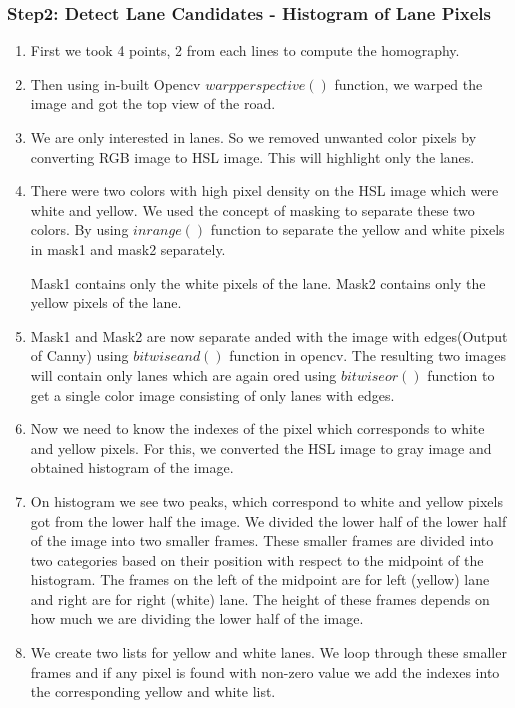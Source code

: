 \documentclass[12pt]{article}
\begin{document}
\subsubsection{Step2: Detect Lane Candidates - Histogram of Lane Pixels}
\begin{enumerate}
\item First we took 4 points, 2  from each lines to compute the homography.

\item Then using in-built Opencv $warpperspective()$ function, we warped the image and got the top view of the road.

\item We are only interested in lanes. So we removed unwanted color pixels by converting RGB image to HSL image. This will highlight only the lanes.

\item There were two colors with high pixel density on the HSL image which were white and yellow. We used the concept of masking to separate these two colors. By using $inrange()$ function to separate the yellow and white pixels in mask1 and mask2 separately.

Mask1 contains only the white pixels of the lane.
Mask2 contains only the yellow pixels of the lane.

\item Mask1 and Mask2 are now separate anded with the image with edges(Output of Canny) using $bitwiseand()$ function in opencv. The resulting two images will contain only lanes which are again ored using $bitwiseor()$ function to get a single color image consisting of only lanes with edges. 

\item Now we need to know the indexes of the pixel which corresponds to white and yellow pixels. For this, we converted the HSL image to gray image and obtained histogram of the image.

\item On histogram we see two peaks, which correspond to white and yellow pixels got from the lower half the image. We divided the lower half of the lower half of the image into two smaller frames. These smaller frames are divided into two categories based on their position with respect to the midpoint of the histogram. The frames on the left of the midpoint are for left (yellow) lane and right are for right (white) lane. The height of these frames depends on how much we are dividing the lower half of the image.

\item We create two lists for yellow and white lanes. We loop through these smaller frames and if any pixel is found with non-zero value we add the indexes into the corresponding yellow and white list.


\end{enumerate}
\end{document}
